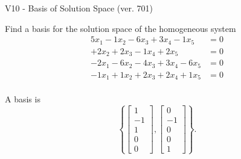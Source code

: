 \begin{exercise}
  \begin{exerciseTitle}V10 - Basis of Solution Space (ver. 701)\end{exerciseTitle}
  \begin{exerciseStatement}
    Find a basis for the solution space of the homogeneous system 
\begin{align*}
 5 x_ 1 -1 x_ 2 -6 x_ 3 + 3 x_ 4 -1 x_ 5 &= 0  \\ 
  + 2 x_ 2 + 2 x_ 3 -1 x_ 4 + 2 x_ 5 &= 0  \\ 
  -2 x_ 1 -6 x_ 2 -4 x_ 3 + 3 x_ 4 -6 x_ 5 &= 0  \\ 
  -1 x_ 1 + 1 x_ 2 + 2 x_ 3 + 2 x_ 4 + 1 x_ 5 &= 0  \\ 
 \end{align*}


 
  \end{exerciseStatement}

  \begin{exerciseAnswer}
   A basis is   
\[\left\{\left[\begin{array}{c}
1 \\
-1 \\
1 \\
0 \\
0
\end{array}\right] , \left[\begin{array}{c}
0 \\
-1 \\
0 \\
0 \\
1
\end{array}\right]\right\}.\]

  


  \end{exerciseAnswer}
\end{exercise}